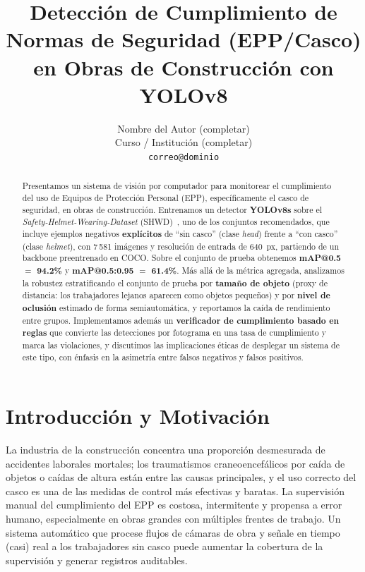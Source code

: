 \documentclass{article}
\title{Detección de Cumplimiento de Normas de Seguridad (EPP/Casco) en Obras de
Construcción con YOLOv8}
\author{%
  Nombre del Autor (completar) \\
  Curso / Institución (completar) \\
  \texttt{correo@dominio}
}
\makeatletter
\newcommand{\dmapfifty}{94.2}      %
\newcommand{\dmapnf}{61.4}         %
\makeatother
\begin{document}
\maketitle

\begin{abstract}
Presentamos un sistema de visión por computador para monitorear el cumplimiento
del uso de Equipos de Protección Personal (EPP), específicamente el casco de
seguridad, en obras de construcción. Entrenamos un detector \textbf{YOLOv8s}
sobre el \emph{Safety-Helmet-Wearing-Dataset} (SHWD)~\citep{njvisionpower2019shwd},
uno de los conjuntos recomendados, que incluye ejemplos negativos
\textbf{explícitos} de ``sin casco'' (clase \emph{head}) frente a ``con casco''
(clase \emph{helmet}), con 7\,581 imágenes y resolución de entrada de 640~px,
partiendo de un backbone preentrenado en COCO. Sobre el conjunto de prueba
obtenemos \textbf{mAP@0.5 $=$ \dmapfifty\%} y \textbf{mAP@0.5:0.95 $=$ \dmapnf\%}.
Más allá de la métrica agregada, analizamos la robustez estratificando el conjunto
de prueba por \textbf{tamaño de objeto} (proxy de distancia: los trabajadores
lejanos aparecen como objetos pequeños) y por \textbf{nivel de oclusión} estimado
de forma semiautomática, y reportamos la caída de rendimiento entre grupos.
Implementamos además un \textbf{verificador de cumplimiento basado en reglas} que
convierte las detecciones por fotograma en una tasa de cumplimiento y marca las
violaciones, y discutimos las implicaciones éticas de desplegar un sistema de este
tipo, con énfasis en la asimetría entre falsos negativos y falsos positivos.
\end{abstract}

\section{Introducción y Motivación}
La industria de la construcción concentra una proporción desmesurada de accidentes
laborales mortales; los traumatismos craneoencefálicos por caída de objetos o
caídas de altura están entre las causas principales, y el uso correcto del casco
es una de las medidas de control más efectivas y baratas. La supervisión manual
del cumplimiento del EPP es costosa, intermitente y propensa a error humano,
especialmente en obras grandes con múltiples frentes de trabajo. Un sistema
automático que procese flujos de cámaras de obra y señale en tiempo (casi) real a
los trabajadores sin casco puede aumentar la cobertura de la supervisión y generar
registros auditables.
\end{document}
